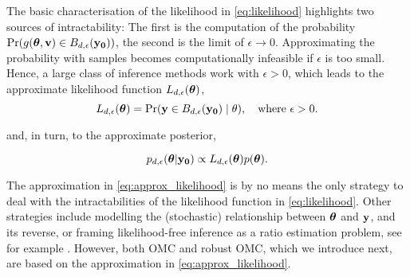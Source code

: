 The basic characterisation of the likelihood in \eqref{eq:likelihood}
highlights two sources of intractability: The first is the computation
of the probability
\(\Pr(g(\boldsymbol{\theta},\mathbf{v}) \in B_{d,\epsilon}(\mathbf{y_0}))\), the second is the
limit of \(\epsilon \to 0\).  Approximating the probability with
samples becomes computationally infeasible if \(\epsilon\) is too
small. Hence, a large class of inference methods work with
\(\epsilon > 0\), which leads to the approximate likelihood function
\(L_{d, \epsilon}(\boldsymbol{\theta})\),
\begin{equation} \label{eq:approx_likelihood}
  L_{d, \epsilon}(\boldsymbol{\theta}) = \Pr(\mathbf{y} \in B_{d,\epsilon}(\mathbf{y_0}) \mid \theta), \quad \text{where  } \epsilon > 0.
\end{equation}

and, in turn, to the approximate posterior,

\begin{equation} \label{eq:approx_posterior}
  p_{d,\epsilon}(\boldsymbol{\theta}|\mathbf{y_0}) \propto L_{d, \epsilon}(\boldsymbol{\theta}) p(\boldsymbol{\theta}).
\end{equation}

The approximation in \eqref{eq:approx_likelihood} is by no means the
only strategy to deal with the intractabilities of the likelihood
function in \eqref{eq:likelihood}. Other strategies include modelling
the (stochastic) relationship between \(\boldsymbol{\theta}\) and \(\mathbf{y}\), and its
reverse, or framing likelihood-free inference as a ratio estimation
problem, see for example \citet{Blum2010, Wood2010, Papamakarios2016,
  Papamakarios2019, Chen2019, Thomas2020, Hermans2020}. However, both
OMC and robust OMC, which we introduce next, are based on the
approximation in \eqref{eq:approx_likelihood}.

